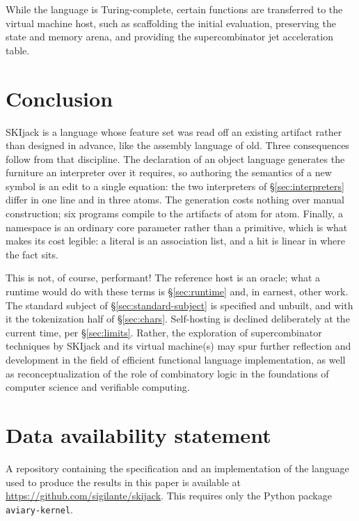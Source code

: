 \documentclass[english,submission,code=tt]{programming}
\begin{document}
While the language is Turing-complete, certain functions are 
transferred to the virtual machine host, such as scaffolding the 
initial evaluation, preserving the state and memory arena, and 
providing the supercombinator jet acceleration table.

\section{Conclusion}

SKIjack is a language whose feature set was read off an existing 
artifact rather than designed in advance, like the assembly language of 
old.  Three consequences follow from that discipline.  The declaration
of an object language generates the furniture an interpreter over it 
requires, so authoring the semantics of a new symbol is an edit to a 
single equation: the two interpreters of \S\ref{sec:interpreters} differ in 
one line and in three atoms. The generation costs nothing over manual 
construction; six programs compile to the artifacts of
\citet{Davis2027} atom for atom.
Finally, a namespace is an ordinary core parameter rather than a 
primitive, which is what makes its cost legible: a literal is an 
association list, and a hit is linear in where the fact sits.

This is not, of course, performant!  The reference host is an oracle; 
what a runtime would do with these terms is \S\ref{sec:runtime} 
and, in earnest, other work. The standard subject of
\S\ref{sec:standard-subject} is specified and unbuilt, and with it the 
tokenization half of \S\ref{sec:chars}. Self-hosting is declined deliberately at the current time, per \S\ref{sec:limits}.
Rather, the exploration
of supercombinator techniques by \mbox{SKIjack} and its virtual machine(s)
may spur further reflection and development in the field of efficient 
functional language implementation, as well as reconceptualization of
the role of combinatory logic in the foundations of computer science
and verifiable computing.

\section*{Data availability statement}

A repository containing the specification and an implementation of the
language used to produce the results in this paper is available at
\url{https://github.com/sigilante/skijack}.
This requires only the Python package \texttt{aviary-kernel}.
\end{document}

